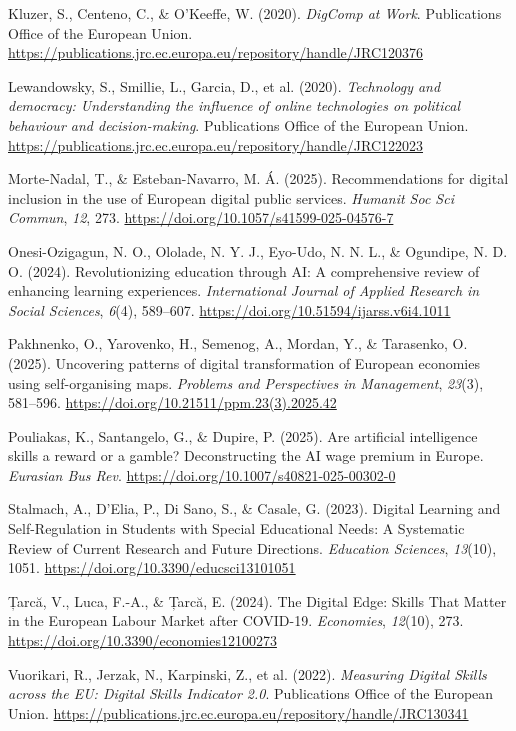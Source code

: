\documentclass[
  dutch,
  letterpaper,
  DIV=11,
  numbers=noendperiod]{scrartcl}
\newlength{\cslhangindent}
\newenvironment{CSLReferences}[2] %
 {\begin{list}{}{%
  \setlength{\itemindent}{0pt}
  \setlength{\leftmargin}{0pt}
  \setlength{\parsep}{0pt}
  \ifodd #1
   \setlength{\leftmargin}{\cslhangindent}
   \setlength{\itemindent}{-1\cslhangindent}
  \fi
  \setlength{\itemsep}{#2\baselineskip}}}
 {\end{list}}
\begin{document}
\begin{CSLReferences}{1}{0}
Kluzer, S., Centeno, C., \& O'Keeffe, W. (2020). \emph{DigComp at Work}.
Publications Office of the European Union.
\url{https://publications.jrc.ec.europa.eu/repository/handle/JRC120376}

Lewandowsky, S., Smillie, L., Garcia, D., et al. (2020).
\emph{Technology and democracy: Understanding the influence of online
technologies on political behaviour and decision-making}. Publications
Office of the European Union.
\url{https://publications.jrc.ec.europa.eu/repository/handle/JRC122023}

Morte-Nadal, T., \& Esteban-Navarro, M. Á. (2025). Recommendations for
digital inclusion in the use of European digital public services.
\emph{Humanit Soc Sci Commun}, \emph{12}, 273.
\url{https://doi.org/10.1057/s41599-025-04576-7}

Onesi-Ozigagun, N. O., Ololade, N. Y. J., Eyo-Udo, N. N. L., \&
Ogundipe, N. D. O. (2024). Revolutionizing education through {AI}: A
comprehensive review of enhancing learning experiences.
\emph{International Journal of Applied Research in Social Sciences},
\emph{6}(4), 589--607. \url{https://doi.org/10.51594/ijarss.v6i4.1011}

Pakhnenko, O., Yarovenko, H., Semenog, A., Mordan, Y., \& Tarasenko, O.
(2025). Uncovering patterns of digital transformation of European
economies using self-organising maps. \emph{Problems and Perspectives in
Management}, \emph{23}(3), 581--596.
\url{https://doi.org/10.21511/ppm.23(3).2025.42}

Pouliakas, K., Santangelo, G., \& Dupire, P. (2025). Are artificial
intelligence skills a reward or a gamble? Deconstructing the {AI} wage
premium in Europe. \emph{Eurasian Bus Rev}.
\url{https://doi.org/10.1007/s40821-025-00302-0}

Stalmach, A., D'Elia, P., Di Sano, S., \& Casale, G. (2023). Digital
Learning and Self-Regulation in Students with Special Educational Needs:
A Systematic Review of Current Research and Future Directions.
\emph{Education Sciences}, \emph{13}(10), 1051.
\url{https://doi.org/10.3390/educsci13101051}

Țarcă, V., Luca, F.-A., \& Țarcă, E. (2024). The Digital Edge: Skills
That Matter in the European Labour Market after {COVID-19}.
\emph{Economies}, \emph{12}(10), 273.
\url{https://doi.org/10.3390/economies12100273}

Vuorikari, R., Jerzak, N., Karpinski, Z., et al. (2022). \emph{Measuring
Digital Skills across the {EU}: Digital Skills Indicator 2.0}.
Publications Office of the European Union.
\url{https://publications.jrc.ec.europa.eu/repository/handle/JRC130341}

\end{CSLReferences}
\end{document}
